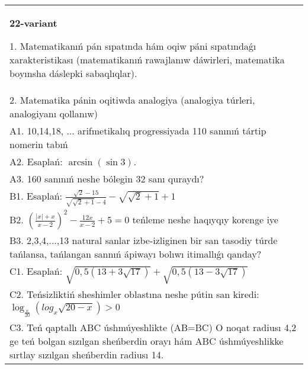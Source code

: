 \documentclass{article}
\begin{document}
\begin{tabular}{m{17cm}}
\textbf{22-variant}

1. Matematikanıń pán sıpatında hám oqiw páni sıpatındaǵı xarakteristikası (matematikanıń rawajlanıw dáwirleri, matematika boyınsha dáslepki sabaqlıqlar). \\
2. Matematika pánin oqitiwda analogiya (analogiya túrleri, analogiyanı qollanıw) \\
A1. 10,14,18, ... arifmetikalıq progressiyada 110 sanınıń tártip nomerin tabıń \\
A2. Esaplań: \(\arcsin (\sin3 ) \). \\
A3. 160 sanınıń neshe bólegin 32 sanı quraydı? \\
B1. Esaplań: \(\frac{\sqrt{2} - 15}{\sqrt{\sqrt{2} + 1} - 4} - \sqrt{\sqrt{2} + 1} + 1\) \\
B2. $(\frac{|x| + x}{x-2})^{2} - \frac{12x}{x-2} + 5 = 0$ teńleme neshe haqıyqıy korenge iye \\
B3. 2,3,4,...,13 natural sanlar izbe-izliginen bir san tasodiy túrde tańlansa, tańlangan sannıń ápiwayı bolıwı itimallıǵı qanday? \\
C1. Esaplań: \(\sqrt{0,5 (13 + 3\sqrt{17}) } + \sqrt{0,5 (13 - 3\sqrt{17}) }\) \\
C2. Teńsizliktiń sheshimler oblastına neshe pútin san kiredi:\(\log_{\frac{x}{20}} (log_{x}\sqrt{20 - x}) > 0\) \\
C3. Teń qaptallı ABC úshmúyeshlikte (AB=BC) O noqat radiusı 4,2 ge teń bolgan sızılgan sheńberdin orayı hám ABC úshmúyeshlikke sırtlay sızılgan sheńberdin radiusı 14. \\

\end{tabular}
\vspace{1cm}
\end{document}
